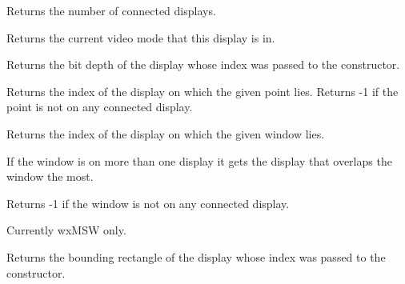 \label{wxdisplaygetcount}


Returns the number of connected displays.


\label{wxdisplaygetcurrentmode}


Returns the current video mode that this display is in. 


\label{wxdisplaygetdepth}


Returns the bit depth of the display whose index was passed to the constructor.


\label{wxdisplaygetfrompoint}


Returns the index of the display on which the given point lies.  Returns -1 if
the point is not on any connected display.




\label{wxdisplaygetfromwindow}


Returns the index of the display on which the given window lies.

If the window is on more than one display it gets the display that overlaps the window the most.

Returns -1 if the window is not on any connected display.

Currently wxMSW only.




\label{wxdisplaygetgeometry}


Returns the bounding rectangle of the display whose index was passed to the
constructor.


\label{wxdisplaygetmodes}


